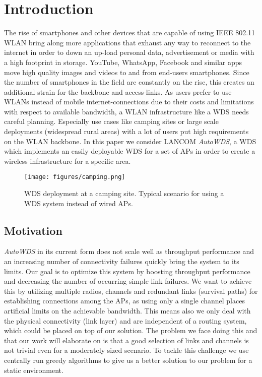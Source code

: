 \chapter{Introduction}
  The rise of smartphones and other devices that are capable of using IEEE 802.11 \ac{WLAN} bring along 
  more applications that exhaust any way to reconnect to the internet in order to 
  down an up-load personal data, advertisement or media with a high footprint in storage.
  YouTube, WhatsApp, Facebook and similar apps move high quality images and videos to and from end-users smartphones. 
  Since the number of smartphones in the field are constantly on the rise, this creates an additional strain for
  the backbone and access-links. As users prefer to use WLANs instead of mobile internet-connections due to their costs and limitations with respect to available bandwidth,
  a \ac{WLAN} infrastructure like a \ac{WDS} needs careful planning. Especially use cases like camping sites or large scale deployments (widespread rural areas) with a lot of users
  put high requirements on the \ac{WLAN} backbone. 
  In this paper we consider LANCOM \textit{AutoWDS}, a \ac{WDS} which implements an easily deployable \ac{WDS} for a set of APs in order to create a wireless 
  infrastructure for a specific area.

  \begin{figure}[h]
    \centering
    \texttt{[image: figures/camping.png]}
    \caption{WDS deployment at a camping site. Typical scenario for using a \ac{WDS} system instead of wired APs.}
    \label{fig:camping}
  \end{figure}
  
\section{Motivation}
  \textit{AutoWDS} in its current form does not scale well as throughput performance and an increasing number of connectivity failures quickly bring the system to its limits.
  Our goal is to optimize this system by boosting throughput performance and decreasing the number of occurring simple link failures.
  We want to achieve this by utilizing multiple radios, channels and redundant links (survival paths) for establishing connections among the APs, as using only a single
  channel places artificial limits on the achievable bandwidth.
  This means also we only deal with the physical connectivity (link layer) and are independent of a routing system, which could be placed on top of our solution.
  The problem we face doing this and that our work will elaborate on is that a good selection of links and channels is not trivial even for a moderately sized scenario.
  To tackle this challenge we use centrally run greedy algorithms to give us a better solution to our problem for a static environment.
  

